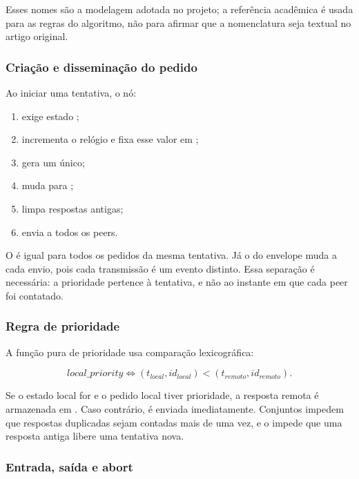 Esses nomes são a modelagem adotada no projeto; a referência acadêmica é usada para as regras do algoritmo, não para afirmar que a nomenclatura seja textual no artigo original.

\subsubsection{Criação e disseminação do pedido}

Ao iniciar uma tentativa, o nó:

\begin{enumerate}
    \item exige estado ;
    \item incrementa o relógio e fixa esse valor em ;
    \item gera um  único;
    \item muda para ;
    \item limpa respostas antigas;
    \item envia  a todos os peers.
\end{enumerate}

O  é igual para todos os pedidos da mesma tentativa. Já o  do envelope muda a cada envio, pois cada transmissão é um evento distinto. Essa separação é necessária: a prioridade pertence à tentativa, e não ao instante em que cada peer foi contatado.

\subsubsection{Regra de prioridade}

A função pura de prioridade usa comparação lexicográfica:

\begin{equation}
    local\_priority \Leftrightarrow
    (t_{local}, id_{local}) < (t_{remoto}, id_{remoto}).
\end{equation}

Se o estado local for  e o pedido local tiver prioridade, a resposta remota é armazenada em . Caso contrário,  é enviada imediatamente. Conjuntos impedem que respostas duplicadas sejam contadas mais de uma vez, e o  impede que uma resposta antiga libere uma tentativa nova.

\subsubsection{Entrada, saída e abort}

